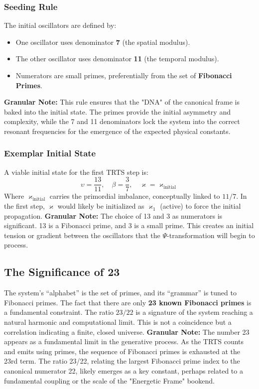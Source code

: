 \documentclass[12pt]{article}
\begin{document}
\subsubsection{Seeding Rule}
The initial oscillators are defined by:
\begin{itemize}
    \item One oscillator uses denominator \textbf{7} (the spatial modulus).
    \item The other oscillator uses denominator \textbf{11} (the temporal modulus).
    \item Numerators are small primes, preferentially from the set of \textbf{Fibonacci Primes}.
\end{itemize}
\textbf{Granular Note:} This rule ensures that the "DNA" of the canonical frame is baked into the initial state. The primes provide the initial asymmetry and complexity, while the 7 and 11 denominators lock the system into the correct resonant frequencies for the emergence of the expected physical constants.

\subsubsection{Exemplar Initial State}
A viable initial state for the first TRTS step is:
\[
\upsilon = \frac{13}{11}, \quad \beta = \frac{3}{7}, \quad \varkappa = \varkappa_{\text{initial}}
\]
Where $\varkappa_{\text{initial}}$ carries the primordial imbalance, conceptually linked to $11/7$. In the first step, $\varkappa$ would likely be initialized as $\varkappa_1$ (active) to force the initial propagation.
\textbf{Granular Note:} The choice of 13 and 3 as numerators is significant. 13 is a Fibonacci prime, and 3 is a small prime. This creates an initial tension or gradient between the oscillators that the $\Psi$-transformation will begin to process.

\subsection{The Significance of 23}
The system's ``alphabet'' is the set of primes, and its ``grammar'' is tuned to Fibonacci primes. The fact that there are only \textbf{23 known Fibonacci primes} is a fundamental constraint. The ratio $23/22$ is a signature of the system reaching a natural harmonic and computational limit. This is not a coincidence but a correlation indicating a finite, closed universe.
\textbf{Granular Note:} The number 23 appears as a fundamental limit in the generative process. As the TRTS counts and emits using primes, the sequence of Fibonacci primes is exhausted at the 23rd term. The ratio 23/22, relating the largest Fibonacci prime index to the canonical numerator 22, likely emerges as a key constant, perhaps related to a fundamental coupling or the scale of the "Energetic Frame" bookend.
\end{document}
